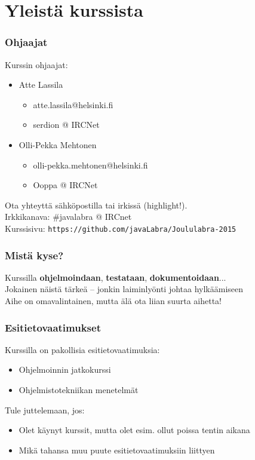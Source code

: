 \documentclass[finnish]{beamer}
\institute{Helsingin Yliopisto, TKTL}
\author{Atte Lassila ja Olli-Pekka Mehtonen}
\date{15. joulukuuta - 10. tammikuuta}
\begin{document}
	\frame{\titlepage}
	
	\section{Yleistä kurssista}
	
	\begin{frame}
		\frametitle{Ohjaajat}
		
		Kurssin ohjaajat:
		\begin{itemize}
			\item Atte Lassila
			\begin{itemize}
				\item atte.lassila@helsinki.fi
				\item serdion @ IRCNet
			\end{itemize}
			\item Olli-Pekka Mehtonen
			\begin{itemize}
				\item olli-pekka.mehtonen@helsinki.fi
				\item Ooppa @ IRCNet
			\end{itemize}
		\end{itemize}
		
		Ota yhteyttä sähköpostilla tai irkissä (highlight!). \\
		Irkkikanava: \#javalabra @ IRCnet \\
		Kurssisivu: \texttt{https://github.com/javaLabra/Joululabra-2015}
	\end{frame}
	
	\begin{frame}
		\frametitle{Mistä kyse?}

		Kurssilla \textbf{ohjelmoindaan}, \textbf{testataan}, \textbf{dokumentoidaan}... \\
		Jokainen näistä tärkeä -- jonkin laiminlyönti johtaa hylkäämiseen \\
		Aihe on omavalintainen, mutta älä ota liian suurta aihetta!
	\end{frame}
	
	\begin{frame}
		\frametitle{Esitietovaatimukset}
		
		Kurssilla on pakollisia esitietovaatimuksia:
		\begin{itemize}
			\item Ohjelmoinnin jatkokurssi
			\item Ohjelmistotekniikan menetelmät
		\end{itemize}
		
		Tule juttelemaan, jos: 
		\begin{itemize}
			\item Olet käynyt kurssit, mutta olet esim. ollut poissa tentin aikana
			\item Mikä tahansa muu puute esitietovaatimuksiin liittyen
		\end{itemize}
	\end{frame}
	
\end{document}
